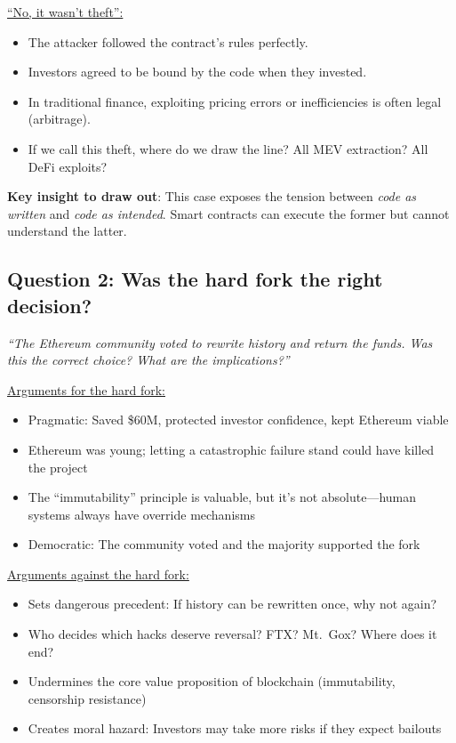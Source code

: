 \documentclass[11pt]{article}
\begin{document}
\medskip
\noindent\underline{``No, it wasn't theft'':}
\begin{itemize}[leftmargin=*]
\item The attacker followed the contract's rules perfectly.
\item Investors agreed to be bound by the code when they invested.
\item In traditional finance, exploiting pricing errors or inefficiencies is often legal (arbitrage).
\item If we call this theft, where do we draw the line? All MEV extraction? All DeFi exploits?
\end{itemize}

\medskip
\noindent\textbf{Key insight to draw out}: This case exposes the tension between \textit{code as written} and \textit{code as intended}. Smart contracts can execute the former but cannot understand the latter.

\subsection*{Question 2: Was the hard fork the right decision?}

\textit{``The Ethereum community voted to rewrite history and return the funds. Was this the correct choice? What are the implications?''}

\medskip
\noindent\underline{Arguments for the hard fork:}
\begin{itemize}[leftmargin=*]
\item Pragmatic: Saved \$60M, protected investor confidence, kept Ethereum viable
\item Ethereum was young; letting a catastrophic failure stand could have killed the project
\item The ``immutability'' principle is valuable, but it's not absolute---human systems always have override mechanisms
\item Democratic: The community voted and the majority supported the fork
\end{itemize}

\medskip
\noindent\underline{Arguments against the hard fork:}
\begin{itemize}[leftmargin=*]
\item Sets dangerous precedent: If history can be rewritten once, why not again?
\item Who decides which hacks deserve reversal? FTX? Mt.\ Gox? Where does it end?
\item Undermines the core value proposition of blockchain (immutability, censorship resistance)
\item Creates moral hazard: Investors may take more risks if they expect bailouts
\end{itemize}
\end{document}
